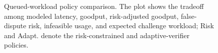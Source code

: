 \documentclass[sigplan,screen,review,anonymous]{acmart}
\newcommand{\suppPolicyCompareWidth}{1\linewidth}
\begin{document}
\begin{figure}[b]
\centering
\resizebox{\suppPolicyCompareWidth}{!}{}
\caption{Queued-workload policy comparison. The plot shows the tradeoff among
modeled latency, goodput, risk-adjusted goodput, false-dispute risk,
infeasible usage, and expected challenge workload; Risk and Adapt. denote the
risk-constrained and adaptive-verifier policies.}
\label{fig:app-placement-policy-compare}
\end{figure}

\clearpage
\end{document}
